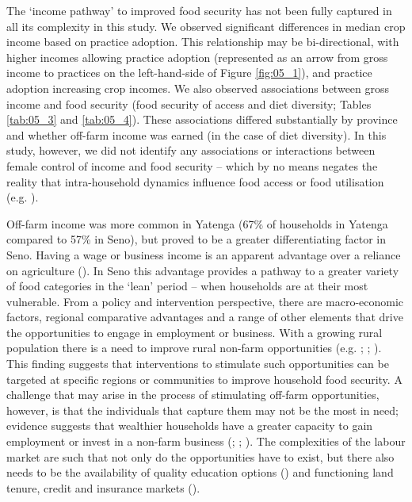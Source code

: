 The `income pathway' to improved food security has not been fully captured in all its complexity in this study. We observed significant differences in median crop income based on practice adoption. This relationship may be bi-directional, with higher incomes allowing practice adoption (represented as an arrow from gross income to practices on the left-hand-side of Figure \ref{fig:05_1}), and practice adoption increasing crop incomes. We also observed associations between gross income and food security (food security of access and diet diversity; Tables \ref{tab:05_3} and \ref{tab:05_4}). These associations differed substantially by province and whether off-farm income was earned (in the case of diet diversity). In this study, however, we did not identify any associations or interactions between female control of income and food security -- which by no means negates the reality that intra-household dynamics influence food access or food utilisation (e.g. \citealp{Mason2015}).

Off-farm income was more common in Yatenga (67\% of households in Yatenga compared to 57\% in Seno), but proved to be a greater differentiating factor in Seno. Having a wage or business income is an apparent advantage over a reliance on agriculture (\citealp{Reardon1992}). In Seno this advantage provides a pathway to a greater variety of food categories in the `lean' period -- when households are at their most vulnerable. From a policy and intervention perspective, there are macro-economic factors, regional comparative advantages and a range of other elements that drive the opportunities to engage in employment or business. With a growing rural population there is a need to improve rural non-farm opportunities (e.g. \citealp{Jayne2014}; \citealp{Haggblade2010}; \citealp{Tiffen2003}). This finding suggests that interventions to stimulate such opportunities can be targeted at specific regions or communities to improve household food security. A challenge that may arise in the process of stimulating off-farm opportunities, however, is that the individuals that capture them may not be the most in need; evidence suggests that wealthier households have a greater capacity to gain employment or invest in a non-farm business (\citealp{Davis2010}; \citealp{Haggblade2010}; \citealp{Reardon1992}). The complexities of the labour market are such that not only do the opportunities have to exist, but there also needs to be the availability of quality education options (\citealp{Jayne2014}) and functioning land tenure, credit and insurance markets (\citealp{Barrett2001}).

